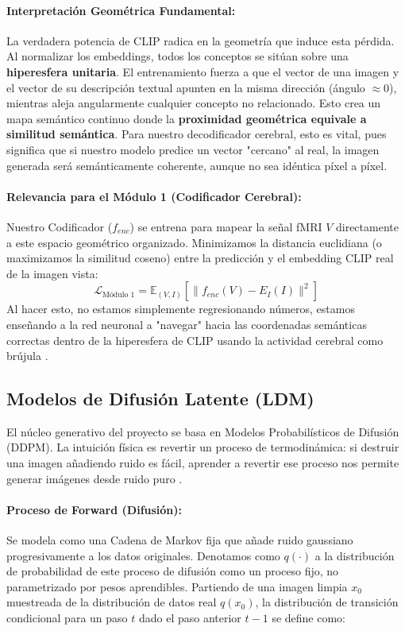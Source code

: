 \documentclass{article}
\begin{document}
\paragraph{Interpretación Geométrica Fundamental:}
La verdadera potencia de CLIP radica en la geometría que induce esta pérdida. Al normalizar los embeddings, todos los conceptos se sitúan sobre una \textbf{hiperesfera unitaria}. El entrenamiento fuerza a que el vector de una imagen y el vector de su descripción textual apunten en la misma dirección (ángulo $\approx 0$), mientras aleja angularmente cualquier concepto no relacionado.
Esto crea un mapa semántico continuo donde la \textbf{proximidad geométrica equivale a similitud semántica}. Para nuestro decodificador cerebral, esto es vital, pues significa que si nuestro modelo predice un vector "cercano" al real, la imagen generada será semánticamente coherente, aunque no sea idéntica píxel a píxel.

\paragraph{Relevancia para el Módulo 1 (Codificador Cerebral):}
Nuestro Codificador ($f_{enc}$) se entrena para mapear la señal fMRI $V$ directamente a este espacio geométrico organizado. Minimizamos la distancia euclidiana (o maximizamos la similitud coseno) entre la predicción y el embedding CLIP real de la imagen vista:
\begin{equation}
\mathcal{L}_{\text{Módulo 1}} = \mathbb{E}_{(V,I)} \left[ \|f_{enc}(V) - E_I(I)\|^2 \right]
\end{equation}
Al hacer esto, no estamos simplemente regresionando números, estamos enseñando a la red neuronal a "navegar" hacia las coordenadas semánticas correctas dentro de la hiperesfera de CLIP usando la actividad cerebral como brújula \cite{15}.


\subsection{Modelos de Difusión Latente (LDM)}

El núcleo generativo del proyecto se basa en Modelos Probabilísticos de Difusión (DDPM). La intuición física es revertir un proceso de termodinámica: si destruir una imagen añadiendo ruido es fácil, aprender a revertir ese proceso nos permite generar imágenes desde ruido puro \cite{15}.

\paragraph{Proceso de Forward (Difusión):}
Se modela como una Cadena de Markov fija que añade ruido gaussiano progresivamente a los datos originales. Denotamos como $q(\cdot)$ a la distribución de probabilidad de este proceso de difusión como un proceso fijo, no parametrizado por pesos aprendibles. Partiendo de una imagen limpia $x_0$ muestreada de la distribución de datos real $q(x_0)$, la distribución de transición condicional para un paso $t$ dado el paso anterior $t-1$ se define como:
\end{document}
